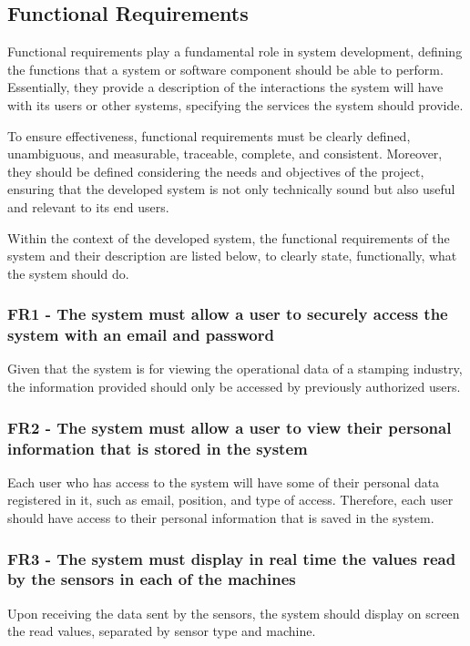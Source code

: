 \subsection[Functional Requirements]{Functional Requirements}
Functional requirements play a fundamental role in system development, defining the functions that a system or software component should be able to perform. Essentially, they provide a description of the interactions the system will have with its users or other systems, specifying the services the system should provide.

To ensure effectiveness, functional requirements must be clearly defined, unambiguous, and measurable, traceable, complete, and consistent. Moreover, they should be defined considering the needs and objectives of the project, ensuring that the developed system is not only technically sound but also useful and relevant to its end users.

Within the context of the developed system, the functional requirements of the system and their description are listed below, to clearly state, functionally, what the system should do.

\subsubsection{FR1 - The system must allow a user to securely access the system with an email and password}Given that the system is for viewing the operational data of a stamping industry, the information provided should only be accessed by previously authorized users.

\subsubsection{FR2 - The system must allow a user to view their personal information that is stored in the system}
Each user who has access to the system will have some of their personal data registered in it, such as email, position, and type of access. Therefore, each user should have access to their personal information that is saved in the system.

\subsubsection{FR3 - The system must display in real time the values read by the sensors in each of the machines}Upon receiving the data sent by the sensors, the system should display on screen the read values, separated by sensor type and machine.

